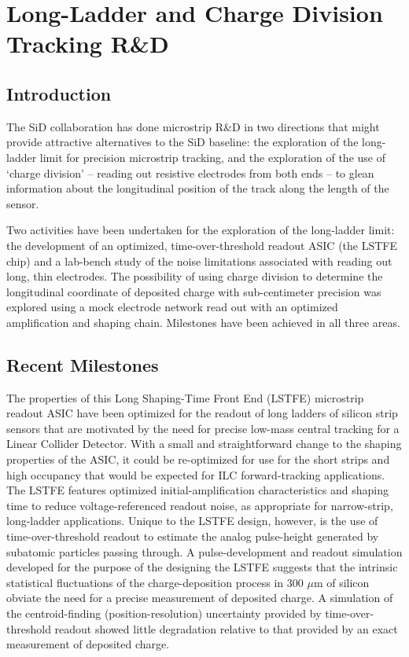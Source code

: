 \documentclass[12pt]{report}
\begin{document}
\section{Long-Ladder and Charge Division Tracking R\&D}

\subsection{Introduction}

The SiD collaboration has done microstrip R\&D in two directions that might provide attractive
alternatives to the SiD baseline: the exploration of the long-ladder limit for precision
microstrip tracking, and the exploration of the use of `charge division' -- reading out
resistive electrodes from both ends -- 
to glean information about the longitudinal position of the track
along the length of the sensor.

Two activities have been undertaken for the exploration of the long-ladder limit:
the development of an optimized, time-over-threshold readout ASIC (the LSTFE chip)
and a lab-bench study of the noise limitations associated with reading out long, 
thin electrodes. 
The possibility of using charge division to determine the longitudinal
coordinate of deposited charge with sub-centimeter precision was explored
using a mock electrode network read out with an optimized amplification and
shaping chain. Milestones have been achieved in all three areas.

\subsection{Recent Milestones}

The properties of this Long Shaping-Time Front End (LSTFE) microstrip readout ASIC have 
been optimized for the readout of long ladders of silicon strip sensors that are motivated 
by the need for precise low-mass central tracking for a Linear Collider Detector. With a 
small and straightforward change to the shaping properties of the ASIC, it could be re-optimized 
for use for the short strips and high occupancy that would be expected for ILC forward-tracking applications.
The LSTFE features optimized initial-amplification characteristics
and shaping time to reduce voltage-referenced readout noise, as appropriate for narrow-strip, long-ladder 
applications. Unique to the LSTFE design, however, is the use of time-over-threshold readout to estimate the 
analog pulse-height generated by subatomic particles passing through. A pulse-development and readout simulation developed 
for the purpose of the designing the LSTFE suggests that the intrinsic statistical fluctuations of the 
charge-deposition process in 300 $\mu$m of silicon obviate the need for a precise measurement 
of deposited charge. A simulation of the centroid-finding (position-resolution) uncertainty provided by 
time-over-threshold readout showed little degradation relative to that provided by an exact measurement of 
deposited charge.
\end{document}
